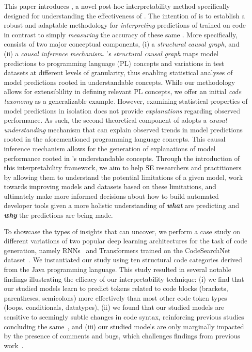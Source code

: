 This paper introduces \codegen, a novel post-hoc interpretability method specifically designed for understanding the effectiveness of \nlms. The intention of \codegen is to establish a robust and adaptable methodology for \textit{interpreting} predictions of \nlms trained on code in contrast to simply \textit{measuring} the accuracy of these same \nlms. More specifically, \codegen consists of two major conceptual components, (i) a \textit{structural causal graph}, and (ii) a \textit{causal inference mechanism}. \codegen's \textit{structural causal graph} maps model predictions to programming language (PL) concepts and variations in test datasets at different levels of granularity, thus enabling statistical analyses of model predictions rooted in understandable concepts. While our methodology allows for extensiblility in defining relevant PL concepts, we offer an initial \textit{code taxonomy} as a generalizable example. However, examining statistical properties of model predictions in isolation does not provide \textit{explanations} regarding observed performance. As such, the second theoretical component of \codegen adopts a \textit{causal understanding} mechanism that can explain observed trends in model predictions rooted in the aforementioned programming language concepts. This causal inference mechanism allows for the generation of explanations of model performance rooted in \codegen's understandable concepts. Through the introduction of this interpretability framework, we aim to help SE researchers and practitioners by allowing them to understand the potential limitations of a given model, work towards improving models and datasets based on these limitations, and ultimately make more informed decisions about how to build automated developer tools given a more holistic understanding of \textit{\textbf{what}} \nlms are predicting and \textit{\textbf{why}} the predictions are being made.

To showcase the types of insights that \codegen can uncover, we perform a case study on different variations of two popular deep learning architectures for the task of code generation, namely RNNs~\citep{RNNs} and Transformers \citep{vaswani2017transformers} trained on the CodeSearchNet dataset~\citep{husain2019codesearchnet}. We instantiated our study using ten structural code categories derived from the Java programming language. This study resulted in several notable findings illustrating the efficacy of our interpretability technique: (i) we find that our studied models learn to predict tokens related to code blocks (\eg brackets, parentheses, semicolons) more effectively than most other code token types (\eg loops, conditionals, datatypes), (ii) we found that our studied models are sensitive to seemingly subtle changes in code syntax, reinforcing previous studies concluding the same~\citep{rabin2021generalizability}, and (iii) our studied models are only marginally impacted by the presence of comments and bugs, which challenges findings from previous work~\citep{Baishakhi2016buggy}.
